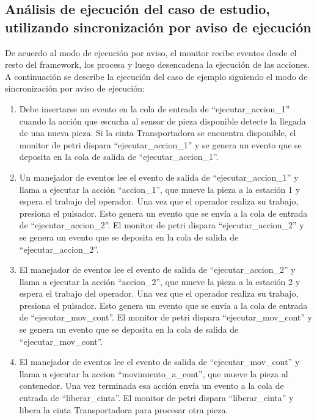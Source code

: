 \subsection{Análisis de ejecución del caso de estudio, utilizando
sincronización por aviso de ejecución} 
De acuerdo al modo de ejecución por aviso, el monitor recibe eventos desde el
resto del framework, los procesa y luego desencadena la ejecución de las
acciones. A continuación se describe la ejecución del caso de ejemplo siguiendo
el modo de sincronización por aviso de ejecución:
\begin{enumerate}
    \item Debe insertarse un evento en la cola de entrada de
    ``ejecutar\_accion\_1'' cuando la acción que escucha al sensor de pieza
    disponible detecte la llegada de una nueva pieza.
    Si la cinta Transportadora se encuentra disponible, el monitor de petri dispara
    “ejecutar\_accion\_1” y se genera un evento que se deposita en la cola de
    salida de “ejecutar\_accion\_1”.
    \item Un manejador de eventos lee el evento de salida de
    “ejecutar\_accion\_1” y llama a ejecutar la acción “accion\_1”, que mueve
    la pieza a la estación 1 y espera el trabajo del operador. Una vez que el
    operador realiza su trabajo, presiona el pulsador. Esto genera un evento
    que se envía a la cola de entrada de “ejecutar\_accion\_2”. El monitor de
    petri dispara “ejecutar\_accion\_2” y se genera un evento que se deposita
    en la cola de salida de “ejecutar\_accion\_2”.
    \item El manejador de eventos
    lee el evento de salida de “ejecutar\_accion\_2” y llama a ejecutar la
    acción “accion\_2”, que mueve la pieza a la estación 2 y espera el trabajo
    del operador. Una vez que el operador realiza su trabajo, presiona el
    pulsador. Esto genera un evento que se envía a la cola de entrada de
    “ejecutar\_mov\_cont”. El monitor de petri dispara
    “ejecutar\_mov\_cont” y se genera un evento que se deposita en la cola de
    salida de “ejecutar\_mov\_cont”.
    \item El manejador de eventos lee el evento de salida de
    “ejecutar\_mov\_cont” y llama a ejecutar la accion “movimiento\_a\_cont”, que
    mueve la pieza al contenedor. Una vez terminada esa acción envía un evento
    a la cola de entrada de “liberar\_cinta”. El monitor de petri dispara
    “liberar\_cinta” y libera la cinta Transportadora para procesar otra pieza.
\end{enumerate}

